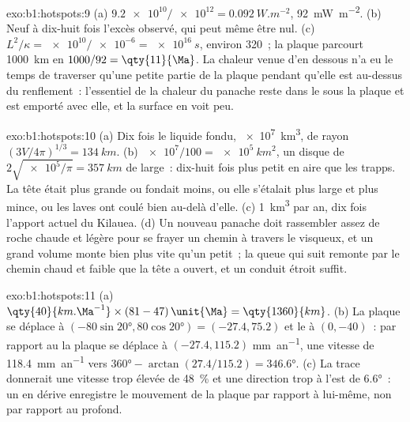 \begin{solution}{exo:b1:hotspots:9}
(a) $\num{9.2e10}/\num{e12} = \qty{0.092}{W.m^{-2}}$, \qty{92}{mW.m^{-2}}.
(b) Neuf à dix-huit fois l'excès observé, qui peut même être nul.
(c) $L^2/\kappa =
\num{e10}/\num{e-6} = \qty{e16}{s}$, environ \qty{320}{\Ma}~; la plaque parcourt
\qty{1000}{km} en $1000/92 = \qty{11}{\Ma}$. La chaleur venue d'en dessous n'a eu le temps de
traverser qu'une petite partie de la plaque pendant qu'elle est au-dessus du renflement~: l'essentiel
de la chaleur du panache reste dans le  sous la plaque et est emporté avec
elle, et la surface en voit peu.
\end{solution}

\begin{solution}{exo:b1:hotspots:10}
(a) Dix fois le liquide fondu, \qty{e7}{km^3}, de rayon
$(3V/4\pi)^{1/3} = \qty{134}{km}$. (b) $\num{e7}/100 = \qty{e5}{km^2}$, un disque
de $2\sqrt{\num{e5}/\pi} = \qty{357}{km}$ de large~: dix-huit fois plus petit en aire
que les trapps. La tête était plus grande ou fondait moins, ou elle s'étalait plus large et
plus mince, ou les laves ont coulé bien au-delà d'elle. (c) \qty{1}{km^3} par an, dix
fois l'apport actuel du Kilauea. (d) Un nouveau panache doit rassembler assez de
roche chaude et légère pour se frayer un chemin à travers le  visqueux, et un grand
volume monte bien plus vite qu'un petit~; la queue qui suit remonte par le
chemin chaud et faible que la tête a ouvert, et un conduit étroit suffit.
\end{solution}

\begin{solution}{exo:b1:hotspots:11}
(a) $\qty{40}{km.\Ma^{-1}}\times(81 - 47)\,\unit{\Ma} = \qty{1360}{km}$.
(b) La plaque se déplace à $(-80\sin\ang{20}, 80\cos\ang{20}) = (-27.4, 75.2)$
et le  à $(0, -40)$~: par rapport au  la plaque se déplace à
$(-27.4, 115.2)$ \unit{mm.an^{-1}}, une vitesse de \qty{118.4}{mm.an^{-1}} vers
$\ang{360} - \arctan(27.4/115.2) = \ang{346.6}$. (c) La trace donnerait une
vitesse trop élevée de \qty{48}{\percent} et une direction trop à l'est de \ang{6.6}~:
un  en dérive enregistre le mouvement de la plaque par rapport à lui-même, non par rapport au
 profond.
\end{solution}

